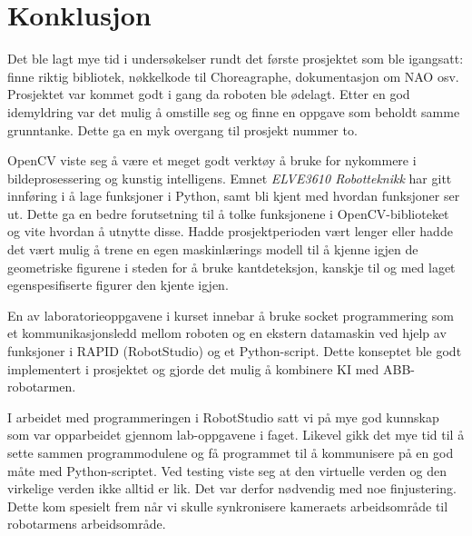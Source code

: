 \documentclass[conference]{IEEEtran}
\begin{document}
    
\section{Konklusjon}
    Det ble lagt mye tid i undersøkelser rundt det første prosjektet som ble igangsatt: finne riktig bibliotek, nøkkelkode til Choreagraphe, dokumentasjon om NAO osv. Prosjektet var kommet godt i gang da roboten ble ødelagt. Etter en god idemyldring var det mulig å omstille seg og finne en oppgave som beholdt samme grunntanke. Dette ga en myk overgang til prosjekt nummer to.

    OpenCV viste seg å være et meget godt verktøy å bruke for nykommere i bildeprosessering og kunstig intelligens. Emnet \textit{ELVE3610 Robotteknikk} har gitt innføring i å lage funksjoner i Python, samt bli kjent med hvordan funksjoner ser ut. Dette ga en bedre forutsetning til å tolke funksjonene i OpenCV-biblioteket og vite hvordan å utnytte disse. Hadde prosjektperioden vært lenger eller  hadde det vært mulig å trene en egen maskinlærings modell til å kjenne igjen de geometriske figurene i steden for å bruke kantdeteksjon, kanskje til og med laget egenspesifiserte figurer den kjente igjen. 

    En av laboratorieoppgavene i kurset innebar å bruke socket programmering som et kommunikasjonsledd mellom roboten og en ekstern datamaskin ved hjelp av funksjoner i RAPID (RobotStudio) og et Python-script. Dette konseptet ble godt implementert i prosjektet og gjorde det mulig å kombinere KI med ABB-robotarmen. 

    I arbeidet med programmeringen i RobotStudio satt vi på mye god kunnskap som var opparbeidet gjennom lab-oppgavene i faget. Likevel gikk det mye tid til å sette sammen programmodulene og få programmet til å kommunisere på en god måte med Python-scriptet. Ved testing viste seg at den virtuelle verden og den virkelige verden ikke alltid er lik. Det var derfor nødvendig med noe finjustering. Dette kom spesielt frem når vi skulle synkronisere kameraets arbeidsområde til robotarmens arbeidsområde. 




%
%
%




\newpage
\appendix

\end{document}
